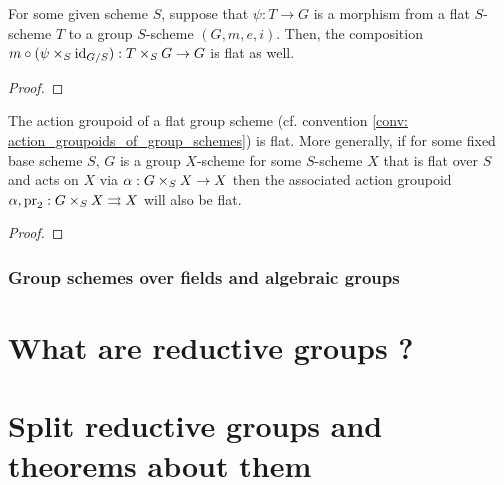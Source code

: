                 \begin{proposition} \label{prop: flatness_criterion_for_action_groupoids_of_group_schemes}
                    For some given scheme $S$, suppose that $\psi: T \to G$ is a morphism from a flat $S$-scheme $T$ to a group $S$-scheme $(G, m, e, i)$. Then, the composition $m \circ (\psi \x_S \id_{G/S}): T \x_S G \to G$ is flat as well.
                \end{proposition}
                    \begin{proof}
                        
                    \end{proof}
                \begin{corollary}
                    The action groupoid of a flat group scheme (cf. convention \ref{conv: action_groupoids_of_group_schemes}) is flat. More generally, if for some fixed base scheme $S$, $G$ is a group $X$-scheme for some $S$-scheme $X$ that is flat over $S$ and acts on $X$ via $\alpha: G \x_S X \to X$ then the associated action groupoid $\alpha, \pr_2: G \x_S X \toto X$ will also be flat.
                \end{corollary}
                
                \begin{proposition} \label{prop: differential_forms_on_group_schemes}
                    
                \end{proposition}
                    \begin{proof}
                        
                    \end{proof}
            
            \subsubsection{Group schemes over fields and algebraic groups}
    
    \section{What are reductive groups ?}
    
    \section{Split reductive groups and theorems about them}